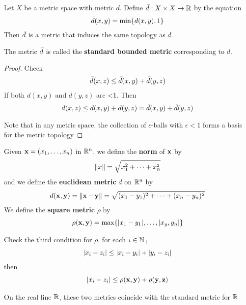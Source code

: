\documentclass[11pt]{article}
\begin{document}
\begin{theorem}[]
Let \(X\) be a metric space with metric \(d\). Define \(\bar{d}:X\times X\to\mathbb{R}\) by the equation
\begin{equation*}
\bar{d}(x,y)=\min\{d(x,y),1\}
\end{equation*}
Then \(\bar{d}\) is a metric that induces the same topology as \(d\).
\end{theorem}

The metric \(\bar{d}\) is called the \textbf{standard bounded metric} corresponding to \(d\).

\begin{proof}
Check
\begin{equation*}
\bar{d}(x,z)\le\bar{d}(x,y)+\bar{d}(y,z)
\end{equation*}
If both \(d(x,y)\) and \(d(y,z)\) are <1. Then
\begin{equation*}
d(x,z)\le d(x,y)+d(y,z)=\bar{d}(x,y)+\bar{d}(y,z)
\end{equation*}

Note that in any metric space, the collection of \(\epsilon\)-balls with \(\epsilon<1\) forms a basis for the
metric topology
\end{proof}

\begin{definition}[]
Given \(\operatorname{\textbf{x}}=(x_1,\dots,x_n)\) in \(\mathbb{R}^n\), we define the \textbf{norm} of \(\operatorname{\textbf{x}}\) by
\begin{equation*}
\left\lVert x\right\rVert=\sqrt{x_1^2+\dots+x_n^2}
\end{equation*}
and we define the \textbf{euclidean metric} \(d\) on \(\mathbb{R}^n\) by
\begin{equation*}
d(\operatorname{\textbf{x}},\operatorname{\textbf{y}})=\left\lVert\operatorname{\textbf{x}}-\operatorname{\textbf{y}}\right\rVert=\sqrt{(x_1-y_1)^2+\dots+(x_n-y_n)^2}
\end{equation*}
We define the \textbf{square metric} \(\rho\) by
\begin{equation*}
\rho(\bx,\by)=\max\{\abs{x_1-y_1},\dots,\abs{x_y,y_n}\}
\end{equation*}
\end{definition}

Check the third condition for \(\rho\). for each \(i\in\mathbb{N}_+\)
\begin{equation*}
\abs{x_i-z_i}\le\abs{x_i-y_i}+\abs{y_i-z_i}
\end{equation*}
then
\begin{equation*}
\abs{x_i-z_i}\le\rho(\bx,\by)+\rho(\by,\bz)
\end{equation*}

On the real line \(\mathbb{R}\), these two metrics coincide with the standard metric for \(\mathbb{R}\)
\end{document}
